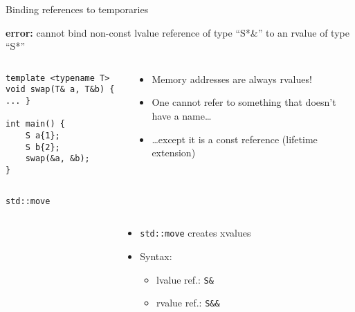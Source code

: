 \begin{frame}[fragile]{Binding references to temporaries}
    \begin{center}
        \textbf{\textcolor{vertexDarkRed}{error:}} cannot bind non-const lvalue reference of type \enquote{S*\&} to an rvalue of type \enquote{S*}
    \end{center}
    \begin{columns}
        \begin{column}{.4\textwidth}
            \begin{lstlisting}
template <typename T>
void swap(T& a, T&b) { ... }

int main() {
    S a{1};
    S b{2};
    swap(&a, &b);
}
            \end{lstlisting}
        \end{column}
        \begin{column}{.55\textwidth}
            \begin{itemize}
                \item Memory addresses are always rvalues!
                \item One cannot refer to something that doesn't have a name\ldots
                \item \ldots except it is a const reference (lifetime extension)
            \end{itemize}
        \end{column}
    \end{columns}
\end{frame}

\begin{frame}
    \centering
\end{frame}

\begin{frame}[fragile]{\texttt{std::move}}
    \begin{columns}
        \begin{column}{.55\textwidth}
        \end{column}
        \begin{column}{.4\textwidth}
            \begin{itemize}
                \item \texttt{std::move} creates xvalues
                \item Syntax:
                \begin{itemize}
                    \item lvalue ref.: \texttt{S\&}
                    \item rvalue ref.: \texttt{S\&\&}
                \end{itemize}
            \end{itemize}
        \end{column}
    \end{columns}
\end{frame}

